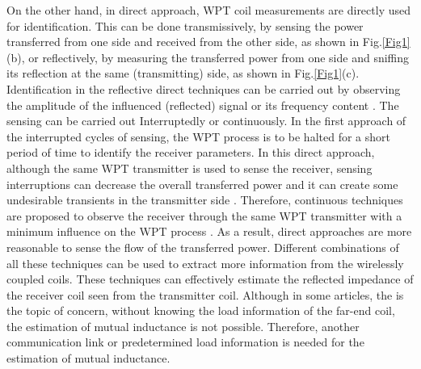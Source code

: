 \documentclass[journal,a4paper]{IEEEtran}
\begin{document}
On the other hand, in direct approach, WPT coil measurements are directly used for identification. This can be done transmissively, by sensing the power transferred from one side and received from the other side, as shown in Fig.\ref{Fig1}(b), or reflectively, by measuring the transferred power from one side and sniffing its reflection at the same (transmitting) side, as shown in Fig.\ref{Fig1}(c). Identification in the reflective direct techniques can be carried out by observing the amplitude of the influenced (reflected) signal \cite{HAN_AMPL_REF,ZHAO_AMPL_REF} or its frequency content \cite{LUSI_FRQ_REF, LI_FRQ_REF, KHAL_FRQ_REF}. The sensing can be carried out Interruptedly or continuously. In the first approach of the interrupted cycles of sensing, the WPT process is to be halted for a short period of time to identify the receiver parameters. In this direct approach, although the same WPT transmitter is used to sense the receiver, sensing interruptions can decrease the overall transferred power and it can create some undesirable transients in the transmitter side \cite{LUSI_FRQ_REF, LI_FRQ_REF, KHAL_FRQ_REF}. Therefore, continuous techniques are proposed to observe the receiver through the same WPT transmitter with a minimum influence on the WPT process \cite{HAN_AMPL_REF,ZHAO_AMPL_REF}. As a result, direct approaches are more reasonable to sense the flow of the transferred power.
Different combinations of all these techniques can be used to extract more information from the wirelessly coupled coils. These techniques can effectively estimate the reflected impedance of the receiver coil seen from the transmitter coil. Although in some articles, the  is the topic of concern, without knowing the load information of the far-end coil, the estimation of mutual inductance is not possible. Therefore, another communication link or  predetermined load information is needed for the estimation of mutual inductance.
\end{document}
